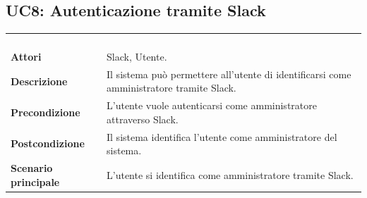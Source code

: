 \newpage
\subsection{UC8: Autenticazione tramite Slack}
\label{UC8}
\begin{longtable}{l|p{10cm}}
\rowcolor[gray]{0.8} \multicolumn{2}{c}{} \\
\rowcolor[gray]{0.8} \multicolumn{2}{c}{\textbf{UC8 - Autenticazione tramite Slack}} \\
\rowcolor[gray]{0.8} \multicolumn{2}{c}{} \\
\hline
&\\
\textbf{Attori} & Slack, Utente.\\[7pt]
\textbf{Descrizione} & Il sistema può permettere all'utente di identificarsi come amministratore tramite Slack.\\[7pt]
\textbf{Precondizione} & L'utente vuole autenticarsi come amministratore attraverso Slack.\\[7pt]
\textbf{Postcondizione} & Il sistema identifica l'utente come amministratore del sistema.\\[7pt]
\textbf{Scenario principale} &L'utente si identifica come amministratore tramite Slack.\\[7pt]\hline
\end{longtable}

